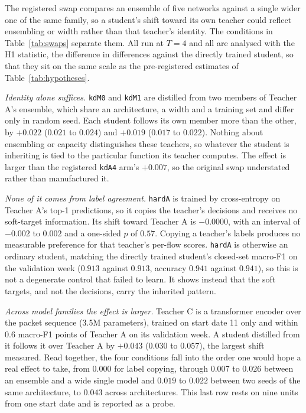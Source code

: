 \documentclass[journal]{IEEEtran}
\newcommand{\kd}[1]{\texttt{#1}}
\begin{document}
The registered swap compares an ensemble of five networks against a single wider one of the same family, so a student's shift toward its own teacher could reflect ensembling or width rather than that teacher's identity. The conditions in Table~\ref{tab:swaps} separate them. All run at $T=4$ and all are analysed with the H1 statistic, the difference in differences against the directly trained student, so that they sit on the same scale as the pre-registered estimates of Table~\ref{tab:hypotheses}.

\emph{Identity alone suffices.} \kd{kdM0} and \kd{kdM1} are distilled from two members of Teacher A's ensemble, which share an architecture, a width and a training set and differ only in random seed. Each student follows its own member more than the other, by $+0.022$ ($0.021$ to $0.024$) and $+0.019$ ($0.017$ to $0.022$). Nothing about ensembling or capacity distinguishes these teachers, so whatever the student is inheriting is tied to the particular function its teacher computes. The effect is larger than the registered \kd{kdA4} arm's $+0.007$, so the original swap understated rather than manufactured it.

\emph{None of it comes from label agreement.} \kd{hardA} is trained by cross-entropy on Teacher A's top-1 predictions, so it copies the teacher's decisions and receives no soft-target information. Its shift toward Teacher A is $-0.0000$, with an interval of $-0.002$ to $0.002$ and a one-sided $p$ of $0.57$. Copying a teacher's labels produces no measurable preference for that teacher's per-flow scores. \kd{hardA} is otherwise an ordinary student, matching the directly trained student's closed-set macro-F1 on the validation week ($0.913$ against $0.913$, accuracy $0.941$ against $0.941$), so this is not a degenerate control that failed to learn. It shows instead that the soft targets, and not the decisions, carry the inherited pattern.

\emph{Across model families the effect is larger.} Teacher C is a transformer encoder over the packet sequence (3.5M parameters), trained on start date 11 only and within 0.6 macro-F1 points of Teacher A on its validation week. A student distilled from it follows it over Teacher A by $+0.043$ ($0.030$ to $0.057$), the largest shift measured. Read together, the four conditions fall into the order one would hope a real effect to take, from $0.000$ for label copying, through $0.007$ to $0.026$ between an ensemble and a wide single model and $0.019$ to $0.022$ between two seeds of the same architecture, to $0.043$ across architectures. This last row rests on nine units from one start date and is reported as a probe.
\end{document}
